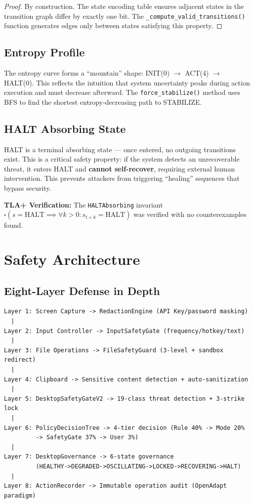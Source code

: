 \documentclass[11pt,a4paper]{article}
\newcommand{\sq}{\square}
\begin{document}
\begin{proof}
By construction. The state encoding table ensures adjacent states in the transition graph differ by exactly one bit. The \texttt{\_compute\_valid\_transitions()} function generates edges only between states satisfying this property.
\end{proof}

\subsection{Entropy Profile}

The entropy curve forms a ``mountain'' shape: INIT(0) $\rightarrow$ ACT(4) $\rightarrow$ HALT(0). This reflects the intuition that system uncertainty peaks during action execution and must decrease afterward. The \texttt{force\_stabilize()} method uses BFS to find the shortest entropy-decreasing path to STABILIZE.

\subsection{HALT Absorbing State}

HALT is a terminal absorbing state --- once entered, no outgoing transitions exist. This is a critical safety property: if the system detects an unrecoverable threat, it enters HALT and \textbf{cannot self-recover}, requiring external human intervention. This prevents attackers from triggering ``healing'' sequences that bypass security.

\medskip
\noindent\textbf{TLA+ Verification:} The \texttt{HALTAbsorbing} invariant $\sq(s = \text{HALT} \implies \forall k > 0: s_{t+k} = \text{HALT})$ was verified with no counterexamples found.

\section{Safety Architecture}
\label{sec:safety}

\subsection{Eight-Layer Defense in Depth}

\begin{verbatim}
Layer 1: Screen Capture -> RedactionEngine (API Key/password masking)
  |
Layer 2: Input Controller -> InputSafetyGate (frequency/hotkey/text)
  |
Layer 3: File Operations -> FileSafetyGuard (3-level + sandbox redirect)
  |
Layer 4: Clipboard -> Sensitive content detection + auto-sanitization
  |
Layer 5: DesktopSafetyGateV2 -> 19-class threat detection + 3-strike lock
  |
Layer 6: PolicyDecisionTree -> 4-tier decision (Rule 40% -> Mode 20%
         -> SafetyGate 37% -> User 3%)
  |
Layer 7: DesktopGovernance -> 6-state governance
         (HEALTHY->DEGRADED->OSCILLATING->LOCKED->RECOVERING->HALT)
  |
Layer 8: ActionRecorder -> Immutable operation audit (OpenAdapt paradigm)
\end{verbatim}
\end{document}
